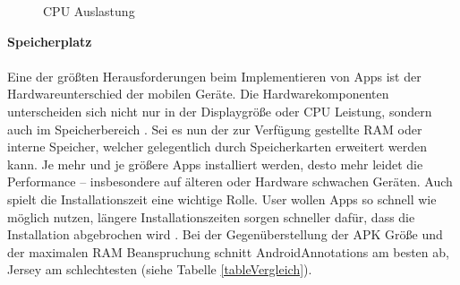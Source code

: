 \begin{figure} [ht]
	\centering
	 \qquad
	 \qquad
	 \qquad
	\caption{CPU Auslastung} 
	\label{cpuAuslastung}
\end{figure} 

{\large \textbf{Speicherplatz}}\\\\
Eine der größten Herausforderungen beim Implementieren von Apps ist der Hardwareunterschied der mobilen Geräte. Die Hardwarekomponenten unterscheiden sich nicht nur in der Displaygröße oder CPU Leistung, sondern auch im Speicherbereich \cite{joorabchi:challenges}. Sei es nun der zur Verfügung gestellte \acrfull{RAM} oder interne Speicher, welcher gelegentlich durch Speicherkarten erweitert werden kann. Je mehr und je größere Apps installiert werden, desto mehr leidet die Performance – insbesondere auf älteren oder Hardware schwachen Geräten. Auch spielt die Installationszeit eine wichtige Rolle. User wollen Apps so schnell wie möglich nutzen, längere Installationszeiten sorgen schneller dafür, dass die Installation abgebrochen wird \cite{schaefers:apk}. Bei der Gegenüberstellung der APK Größe und der maximalen RAM Beanspruchung schnitt AndroidAnnotations am besten ab, Jersey am schlechtesten (siehe Tabelle \ref{tableVergleich}). 


